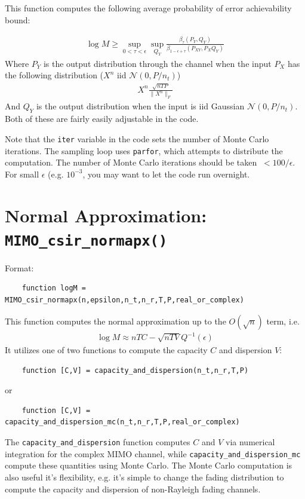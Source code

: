 \documentclass[a4paper,11p]{memoir}
\begin{document}
This function computes the following average probability of error achievability bound:

\begin{align*}
\log M \geq \sup_{0<\tau<\epsilon} \sup_{Q_Y}\frac{\beta_{\tau}(P_Y,Q_Y)}{\beta_{1-\epsilon+\tau}(P_{XY},P_XQ_Y)}
\end{align*}
Where $P_Y$ is the output distribution through the channel when the input $P_X$ has the following distribution ($X^n$ iid $\mathcal{N}(0,P/n_t)$)
\begin{align*}
X^n \frac{\sqrt{nTP}}{\|X^n\|_F}
\end{align*}
And $Q_Y$ is the output distribution when the input is iid Gaussian $\mathcal{N}(0,P/n_t)$.  Both of these are fairly easily adjustable in the code.

Note that the \verb|iter| variable in the code sets the number of Monte Carlo iterations.  The sampling loop uses \verb|parfor|, which attempts to distribute the computation.  The number of Monte Carlo iterations should be taken $~< 100/\epsilon$.  For small $\epsilon$ (e.g. $10^{-3}$, you may want to let the code run overnight.

\section{Normal Approximation: \texttt{MIMO\_csir\_normapx()}}

Format:
\begin{verbatim}
    function logM = MIMO_csir_normapx(n,epsilon,n_t,n_r,T,P,real_or_complex)
\end{verbatim}

This function computes the normal approximation up to the $O(\sqrt{n})$ term, i.e.
\begin{align*}
\log M \approx nTC - \sqrt{nTV}Q^{-1}(\epsilon)
\end{align*}
It utilizes one of two functions to compute the capacity $C$ and dispersion $V$:
\begin{verbatim}
    function [C,V] = capacity_and_dispersion(n_t,n_r,T,P)
\end{verbatim}
or
\begin{verbatim}
    function [C,V] = capacity_and_dispersion_mc(n_t,n_r,T,P,real_or_complex)
\end{verbatim}
The \verb|capacity_and_dispersion| function computes $C$ and $V$ via numerical integration for the complex MIMO channel, while \verb|capacity_and_dispersion_mc| compute these quantities using Monte Carlo.  The Monte Carlo computation is also useful it's flexibility, e.g. it's simple to change the fading distribution to compute the capacity and dispersion of non-Rayleigh fading channels.
\end{document}
